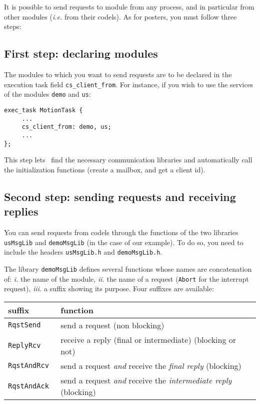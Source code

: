 It is  possible to  send  requests to module   from any  process,  and in
particular from  other  modules ({\em i.e.} from  their  codels). As  for
posters, you must follow three steps:

\subsection{First step: declaring modules}

The modules to which you want to send requests are  to be declared in the
execution task field {\tt cs\_client\_from}. For instance, if you wish to
use the services of the modules {\tt demo} and {\tt us}:

\begin{center}\begin{cartouche}\small\begin{verbatim}
exec_task MotionTask {
     ...
     cs_client_from: demo, us;
     ...
};
\end{verbatim}\end{cartouche}\end{center}

This  step lets \GenoM\  find  the necessary communication libraries  and
automatically call  the initialization  functions (create a  mailbox, and
get a client id).

\subsection{Second step: sending requests and receiving replies}

You   can send requests from   codels  through the  functions  of the two
libraries  {\tt usMsgLib}   and {\tt  demoMsgLib}  (in  the case of   our
example). To do so, you need to include the  headers {\tt usMsgLib.h} and
{\tt demoMsgLib.h}.

The library {\tt demoMsgLib}  defines  several functions whose  names are
concatenation of: {\em i.} the name of the module, {\em  ii.} the name of
a request ({\tt  Abort} for the interrupt request),  {\em iii.} a  suffix
showing its purpose. Four suffixes are available:


\begin{center}\small\begin{tabularx}{\linewidth}{|l|X|}
\hline
suffix & function \\
\hline
\tt RqstSend & send a request (non blocking) \\

\tt ReplyRcv & receive a reply (final or intermediate)  (blocking or not)\\

\tt RqstAndRcv & send a request {\em and} receive the {\em final reply}
(blocking) \\

\tt RqstAndAck & send a request {\em and} receive the {\em intermediate reply}
(blocking) \\
\hline
\end{tabularx}\end{center}


